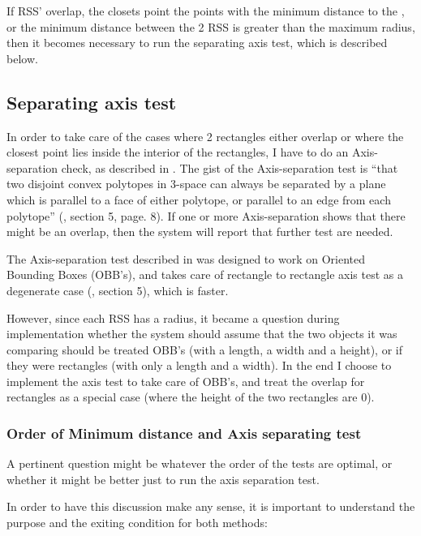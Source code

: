 If RSS' overlap, the closets point the points with the minimum distance to the  , or the minimum distance between the 2 RSS is greater than the maximum radius, then it becomes necessary to run the separating axis test, which is described below.

\subsection{Separating axis test}
\label{sepAxis}
In order to take care of the cases where 2 rectangles either overlap or where the closest point lies inside the interior of the rectangles, I have to do an Axis-separation check, as described in \cite{237244}. The gist of the Axis-separation test is ``that two disjoint convex polytopes in 3-space can always be separated by a plane which is parallel to a face of either polytope, or parallel to an edge from each polytope'' (\cite{237244}, section 5, page. 8). If one or more Axis-separation shows that there might be an overlap, then the system will report that further test are needed.

The Axis-separation test described in \cite{237244} was designed to work on Oriented Bounding Boxes (OBB's), and takes care of rectangle to rectangle axis test as a degenerate case (\cite{237244}, section 5), which is faster. 

However, since each RSS has a radius, it became a question during implementation whether the system should assume that the two objects it was comparing should be treated OBB's (with a length, a width and a height), or if they were rectangles (with only a length and a width). In the end I choose to implement the axis test to take care of OBB's, and treat the overlap for rectangles as a special case (where the height of the two rectangles are 0).

\subsubsection{Order of Minimum distance and Axis separating test}
\label{minAxisOrder}
A pertinent question might be whatever the order of the tests are optimal, or whether it might be better just to run the axis separation test.

In order to have this discussion make any sense, it is important to understand the purpose and the exiting condition for both methods:


